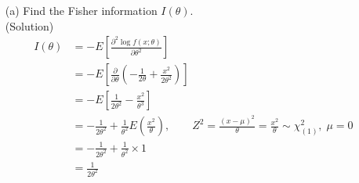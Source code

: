 \documentclass{oblivoir}
\newcommand{\flr}[1]{\left ( #1 \right )}
\newcommand{\tlr}[1]{\left [ #1 \right]}
\newcommand{\blue}[1]{{\color{blue} #1}}
\begin{document}
\begin{enumerate}
\begin{enumerate}
\item[(a)]
Find the Fisher information $I(\theta)$. \\
\blue{(Solution)}
\begin{align*}
I(\theta) &= -E\tlr{\frac{\partial^2 \log f(x;\theta)}{\partial \theta^2}}  \\
&= -E\tlr{\frac{\partial}{\partial \theta} \flr{-\frac{1}{2\theta} + \frac{x^2}{2\theta^2}}} \\
&= -E\tlr{\frac{1}{2\theta^2} - \frac{x^2}{\theta^3}} \\
&= -\frac{1}{2\theta^2} + \frac{1}{\theta^2} E\flr{\frac{x^2}{\theta}}, \qquad Z^2 = \frac{(x-\mu)^2}{\theta} = \frac{x^2}{\theta} \sim \chi^2_{(1)} , \; \mu = 0\\
&= -\frac{1}{2\theta^2} + \frac{1}{\theta^2} \times 1 \\
&= \frac{1}{2\theta^2}
\end{align*}


\end{enumerate}
\end{enumerate}
\end{document}
